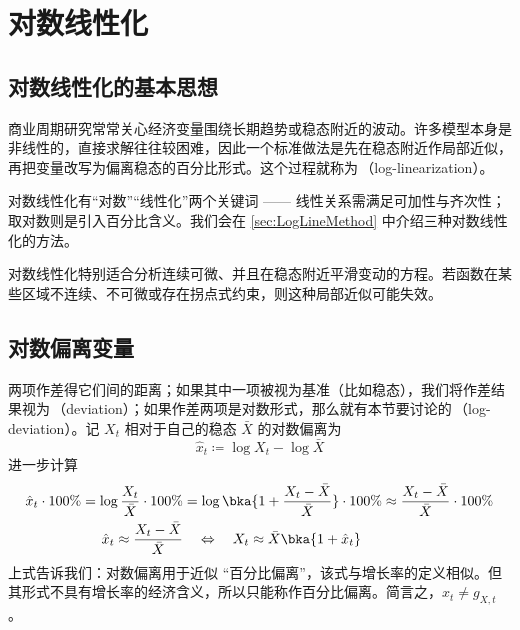 

\ChapterGeometry

\chapter{对数线性化}\label{ch:02}

\section{对数线性化的基本思想}\label{sec:LogLineIdea}

商业周期研究常常关心经济变量围绕长期趋势或稳态附近的波动。许多模型本身是非线性的，直接求解往往较困难，因此一个标准做法是先在稳态附近作局部近似，再把变量改写为偏离稳态的百分比形式。这个过程就称为\,（log-linearization）。

对数线性化有“对数”“线性化”两个关键词 —— 线性关系需满足可加性与齐次性；取对数则是引入百分比含义。我们会在 \ref{sec:LogLineMethod} 中介绍三种对数线性化的方法。

对数线性化特别适合分析连续可微、并且在稳态附近平滑变动的方程。若函数在某些区域不连续、不可微或存在拐点式约束，则这种局部近似可能失效。


\section{对数偏离变量}\label{sec:HatVar}

两项作差得它们间的距离；如果其中一项被视为基准（比如稳态），我们将作差结果视为\,（deviation）；如果作差两项是对数形式，那么就有本节要讨论的\,（log-deviation）。记 \(X_t\) 相对于自己的稳态 \(\bar X\) 的对数偏离为
\begin{equation}
    \hat x_t\coloneq \log X_t-\log\bar X\label{eq:HatDef}
\end{equation}
进一步计算
\begin{align}
    \hat x_t\cdot100\%=\log\frac{X_t}{\bar X}\cdot100\%&=\log\bka{1+\frac{X_t-\bar X}{\bar X}}\cdot100\%\approx \frac{X_t-\bar X}{\bar X}\cdot100\%\notag\\
    \hat x_t\approx \dfrac{X_t-\bar X}{\bar X} &\quad\Leftrightarrow\quad X_t\approx \bar X\bka{1+\hat x_t}
    \label{eq:HatPercent}
\end{align}
上式告诉我们：对数偏离用于近似 “百分比偏离”，该式与增长率的定义相似。但其形式不具有增长率的经济含义，所以只能称作百分比偏离。简言之，\(\hat x_t\ne g_{X,t}\,\)。

